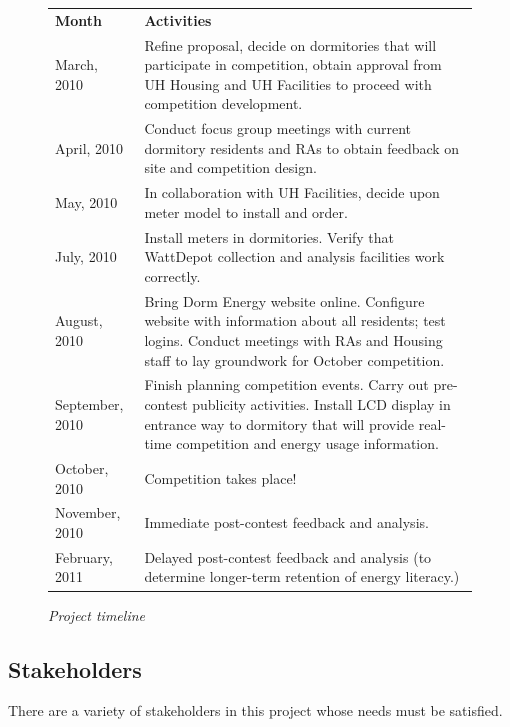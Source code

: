 \documentclass[11pt]{article}
\begin{document}
\begin{figure}[!ht]
\small
\begin{tabular}{p{1in}p{5in}} \hline
{\bf Month} & {\bf Activities}  \\
March, 2010 &  Refine proposal, decide on dormitories that will
participate in competition, obtain approval from UH Housing and UH Facilities to proceed with competition development. \\

April, 2010 & Conduct focus group meetings with current
dormitory residents and RAs to obtain feedback on site and competition
design. \\

May, 2010 &  In collaboration with UH Facilities, decide upon meter model to install and order. \\

July, 2010 & Install meters in dormitories.  Verify that WattDepot collection and analysis facilities work correctly. \\

August, 2010 & Bring Dorm Energy website online.  Configure website with information about all residents; test logins.  Conduct meetings with RAs and Housing staff to lay groundwork for October competition. \\

September, 2010 & Finish planning competition events.  Carry out pre-contest publicity activities.  Install LCD display in entrance way to dormitory that will provide real-time competition and energy usage information.    \\

October, 2010 & Competition takes place! \\

November, 2010 &  Immediate post-contest feedback and analysis.  \\

February, 2011 &  Delayed post-contest feedback and analysis (to determine longer-term retention of energy literacy.)  \\ \hline
\end{tabular} 
\normalsize
\caption{{\em Project timeline}}
\label{fig:timeline}
\end{figure}

\subsection{Stakeholders}

There are a variety of stakeholders in this project whose needs must be satisfied. 
\end{document}
